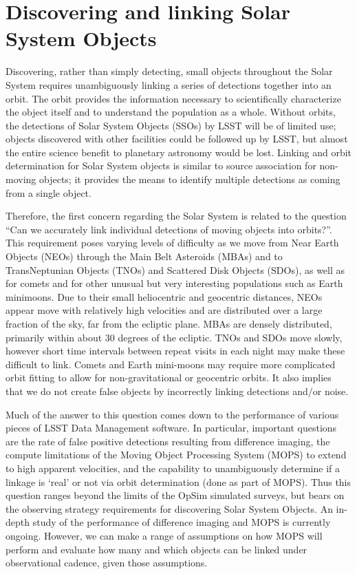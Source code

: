 
\section{Discovering and linking Solar System Objects}
\def\secname{\chpname:discovery}\label{sec:\secname}

Discovering, rather than simply detecting, small objects throughout
the Solar System requires unambiguously linking a series of detections
together into an orbit. The orbit provides the information necessary
to scientifically characterize the object itself and to understand the
population as a whole. Without orbits, the detections of Solar System
Objects (SSOs) by LSST will be of limited use; objects discovered with
other facilities could be followed up by LSST, but almost the entire
science benefit to planetary astronomy would be lost. Linking and
orbit determination for Solar System objects is similar to source
association for non-moving objects; it provides the means to identify
multiple detections as coming from a single object.

Therefore, the first concern regarding the Solar System is related
to the question ``Can we accurately link individual detections of moving objects into
orbits?''.  This requirement poses varying levels of difficulty as we
move from Near Earth Objects (NEOs) through the Main Belt Asteroids
(MBAs) and to TransNeptunian Objects (TNOs) and Scattered Disk Objects
(SDOs), as well as for comets and for other unusual but very
interesting populations such as Earth minimoons. Due to their small
heliocentric and geocentric distances, NEOs appear move with
relatively high velocities and are distributed over a large fraction
of the sky, far from the ecliptic plane. MBAs are densely distributed,
primarily within about 30 degrees of the ecliptic. TNOs and SDOs move
slowly, however short time intervals between repeat visits in each night may make these difficult
to link. Comets and Earth mini-moons may require more complicated
orbit fitting to allow for non-gravitational or geocentric
orbits. It also implies that we do not create false objects by
incorrectly linking detections and/or noise.

Much of the answer to this question comes down to the performance of
various pieces of LSST Data Management software. In particular,
important questions are the
rate of false positive detections resulting from difference imaging, the compute
limitations of the Moving Object Processing System (MOPS) to extend to high
apparent velocities, and the capability to unambiguously determine if
a linkage is `real' or not via orbit determination (done as part of
MOPS). Thus this question ranges beyond the limits of the OpSim simulated
surveys, but bears on the observing strategy requirements for
discovering Solar System Objects. An in-depth study of the performance
of difference imaging and MOPS is currently ongoing. However, we can
make a range of assumptions on how MOPS will perform and evaluate how
many and which objects can be linked under observational cadence, given those assumptions.



